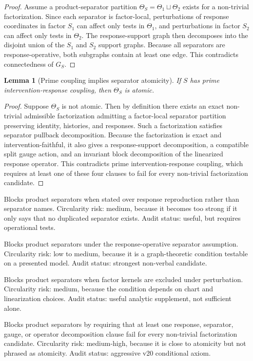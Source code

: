 \documentclass[11pt]{article}
\newtheorem{lemma}[definition]{Lemma}
\begin{document}
\begin{proof}
Assume a product-separator partition $\Theta_S=\Theta_1\sqcup\Theta_2$ exists for a non-trivial factorization. Since each separator is factor-local, perturbations of response coordinates in factor $S_1$ can affect only tests in $\Theta_1$, and perturbations in factor $S_2$ can affect only tests in $\Theta_2$. The response-support graph then decomposes into the disjoint union of the $S_1$ and $S_2$ support graphs. Because all separators are response-operative, both subgraphs contain at least one edge. This contradicts connectedness of $G_S$.
\end{proof}

\begin{lemma}[Prime coupling implies separator atomicity]
If $S$ has prime intervention-response coupling, then $\Theta_S$ is atomic.
\end{lemma}

\begin{proof}
Suppose $\Theta_S$ is not atomic. Then by definition there exists an exact non-trivial admissible factorization admitting a factor-local separator partition preserving identity, histories, and responses. Such a factorization satisfies separator pullback decomposition. Because the factorization is exact and intervention-faithful, it also gives a response-support decomposition, a compatible split gauge action, and an invariant block decomposition of the linearized response operator. This contradicts prime intervention-response coupling, which requires at least one of these four clauses to fail for every non-trivial factorization candidate.
\end{proof}

\begin{description}[leftmargin=2.8cm]
  \item[No-cloning.] Blocks product separators when stated over response reproduction rather than separator names. Circularity risk: medium, because it becomes too strong if it only says that no duplicated separator exists. Audit status: useful, but requires operational tests.
  \item[Connected support.] Blocks product separators under the response-operative separator assumption. Circularity risk: low to medium, because it is a graph-theoretic condition testable on a presented model. Audit status: strongest non-verbal candidate.
  \item[Kernel robustness.] Blocks product separators when factor kernels are excluded under perturbation. Circularity risk: medium, because the condition depends on chart and linearization choices. Audit status: useful analytic supplement, not sufficient alone.
  \item[Prime coupling.] Blocks product separators by requiring that at least one response, separator, gauge, or operator decomposition clause fail for every non-trivial factorization candidate. Circularity risk: medium-high, because it is close to atomicity but not phrased as atomicity. Audit status: aggressive v20 conditional axiom.
\end{description}
\end{document}
